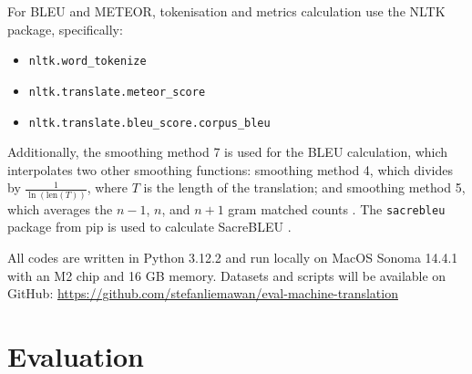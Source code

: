 \documentclass[a4paper, 11pt]{article}
\begin{document}
For BLEU and METEOR, tokenisation and metrics calculation use the NLTK \cite{bird-2009-natural} package, specifically:
\begin{itemize}
    \item \texttt{nltk.word\_tokenize} \\
    \item \texttt{nltk.translate.meteor\_score} \\
    \item \texttt{nltk.translate.bleu\_score.corpus\_bleu}
\end{itemize}
Additionally, the smoothing method 7 is used for the BLEU calculation, which interpolates two other smoothing functions: smoothing method 4, which divides by \( \frac{1}{\ln(\text{len}(T))} \), where \( T \) is the length of the translation; and smoothing method 5, which averages the \( n-1 \), \( n \), and \( n+1 \) gram matched counts \cite{nltk-bleu-docs}. The \texttt{sacrebleu} \cite{post-2018-sacrebleu} package from pip is used to calculate SacreBLEU \cite{post-2018-sacrebleu}.

All codes are written in Python 3.12.2 and run locally on MacOS Sonoma 14.4.1 with an M2 chip and 16 GB memory. Datasets and scripts will be available on GitHub: \url{https://github.com/stefanliemawan/eval-machine-translation}

\section{Evaluation}
\end{document}
